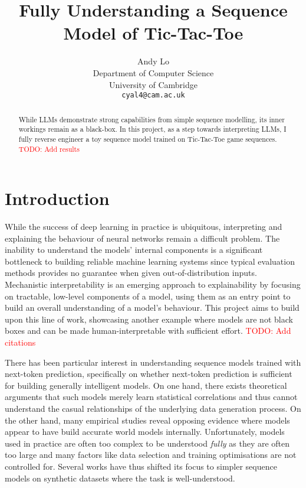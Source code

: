 \documentclass{article}
\title{Fully Understanding a Sequence Model of Tic-Tac-Toe}
\author{%
  Andy Lo \\
  Department of Computer Science\\
  University of Cambridge\\
  \texttt{cyal4@cam.ac.uk} \\
}
\newcommand{\todo}[1]{\textcolor{red}{TODO: #1}}
\newcommand{\ttt}{Tic-Tac-Toe\xspace}
\begin{document}
\begin{acronym}
\end{acronym}


\maketitle


\begin{abstract}
    While \ac{LLMs} demonstrate strong capabilities from simple sequence modelling, its inner workings remain as a black-box. In this project, as a step towards interpreting \ac{LLMs}, I fully reverse engineer a toy sequence model trained on \ttt game sequences. \todo{Add results}
\end{abstract}


\section{Introduction}

While the success of deep learning in practice is ubiquitous, interpreting and explaining the behaviour of neural networks remain a difficult problem. The inability to understand the models' internal components is a significant bottleneck to building reliable machine learning systems since typical evaluation methods provides no guarantee when given out-of-distribution inputs. Mechanistic interpretability is an emerging approach to explainability by focusing on tractable, low-level components of a model, using them as an entry point to build an overall understanding of a model's behaviour. This project aims to build upon this line of work, showcasing another example where models are not black boxes and can be made human-interpretable with sufficient effort. \todo{Add citations}

There has been particular interest in understanding sequence models trained with next-token prediction, specifically on whether next-token prediction is sufficient for building generally intelligent models. On one hand, there exists theoretical arguments \citep{bender2020climbing,merrill2021provable} that such models merely learn statistical correlations and thus cannot understand the casual relationships of the underlying data generation process. On the other hand, many empirical studies reveal opposing evidence where models appear to have build accurate world models internally. Unfortunately, models used in practice are often too complex to be understood \emph{fully} as they are often too large and many factors like data selection and training optimisations are not controlled for. Several works have thus shifted its focus to simpler sequence models on synthetic datasets \citep{toshniwal2021learning,orthello-gpt} where the task is well-understood.
\end{document}
